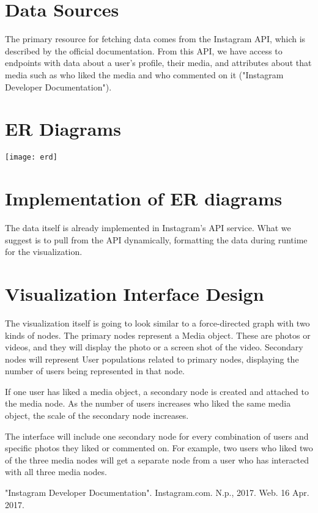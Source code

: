 \documentclass[journal]{vgtc}                %
\begin{document}
\section{Data Sources}
The primary resource for fetching data comes from the Instagram API, which is described by the official documentation. From this API, we have access to endpoints with data about a user's profile, their media, and attributes about that media such as who liked the media and who commented on it ("Instagram Developer Documentation").

\section{ER Diagrams}
\texttt{[image: erd]}

\section{Implementation of ER diagrams}
The data itself is already implemented in Instagram's API service. What we suggest is to pull from the API dynamically, formatting the data during runtime for the visualization.

\section{Visualization Interface Design}
The visualization itself is going to look similar to a force-directed graph with two kinds of nodes. The primary nodes represent a Media object. These are photos or videos, and they will display the photo or a screen shot of the video. Secondary nodes will represent User populations related to primary nodes, displaying the number of users being represented in that node.

If one user has liked a media object, a secondary node is created and attached to the media node. As the number of users increases who liked the same media object, the scale of the secondary node increases.

The interface will include one secondary node for every combination of users and specific photos they liked or commented on. For example, two users who liked two of the three media nodes will get a separate node from a user who has interacted with all three media nodes.




%

%
%
%


"Instagram Developer Documentation". Instagram.com. N.p., 2017. Web. 16 Apr. 2017.
\end{document}
